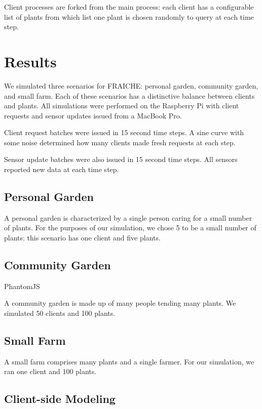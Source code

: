 \documentclass[a4paper]{acm_proc_article-sp}
\begin{document}
Client processes are forked from the main process: each client has a configurable list of plants from which list one plant is chosen randomly to query at each time step.  

\section{Results}

We simulated three scenarios for FRAICHE: personal garden, community garden, and small farm.  Each of these scenarios has a distinctive balance between clients and plants.  All simulations were performed on the Raspberry Pi with client requests and sensor updates issued from a MacBook Pro.

Client request batches were issued in 15 second time steps.  A sine curve with some noise determined how many clients made fresh requests at each step.

Sensor update batches were also issued in 15 second time steps.  All sensors reported new data at each time step.

\subsection{Personal Garden}

A personal garden is characterized by a single person caring for a small number of plants.  For the purposes of our simulation, we chose 5 to be a small number of plants: this scenario has one client and five plants.

\subsection{Community Garden}

PhantomJS

A community garden is made up of many people tending many plants.  We simulated 50 clients and 100 plants.

\subsection{Small Farm}

A small farm comprises many plants and a single farmer.  For our simulation, we ran one client and 100 plants.

\subsection{Client-side Modeling}
\end{document}
